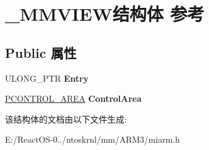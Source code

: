 \hypertarget{struct___m_m_v_i_e_w}{}\section{\+\_\+\+M\+M\+V\+I\+E\+W结构体 参考}
\label{struct___m_m_v_i_e_w}
\subsection*{Public 属性}
\begin{DoxyCompactItemize}
\item 
\mbox{\label{struct___m_m_v_i_e_w_aa20a4720623e9b61216610ca4efa3563}} 
U\+L\+O\+N\+G\+\_\+\+P\+TR {\bfseries Entry}
\item 
\mbox{\label{struct___m_m_v_i_e_w_a7b5522e676d79a0b9536ce1c2ac50aa1}} 
\hyperlink{struct___c_o_n_t_r_o_l___a_r_e_a}{P\+C\+O\+N\+T\+R\+O\+L\+\_\+\+A\+R\+EA} {\bfseries Control\+Area}
\end{DoxyCompactItemize}


该结构体的文档由以下文件生成\+:\begin{DoxyCompactItemize}
\item 
E\+:/\+React\+O\+S-\/0../ntoskrnl/mm/\+A\+R\+M3/miarm.\+h\end{DoxyCompactItemize}
